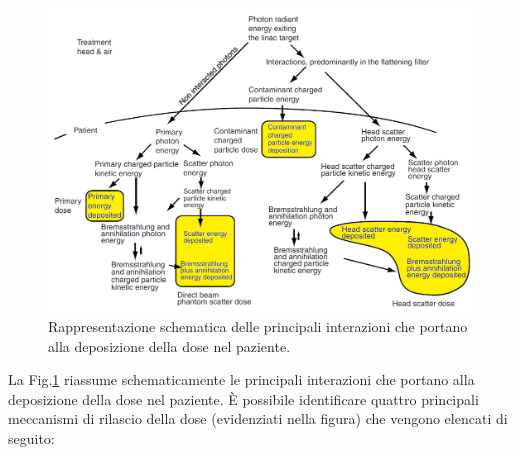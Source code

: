 \begin{figure}
\centering
\includegraphics[width=.9\textwidth]{./cap1/processes.png}
\caption{Rappresentazione schematica delle principali interazioni che portano alla deposizione della dose nel paziente.}
\label{fig:processes}
\end{figure}
\vspace{.2cm}
La Fig.\ref{fig:processes} riassume schematicamente le principali interazioni che portano alla deposizione della dose nel paziente. \`{E} possibile identificare quattro principali meccanismi di rilascio della dose (evidenziati nella figura) che vengono elencati di seguito:
